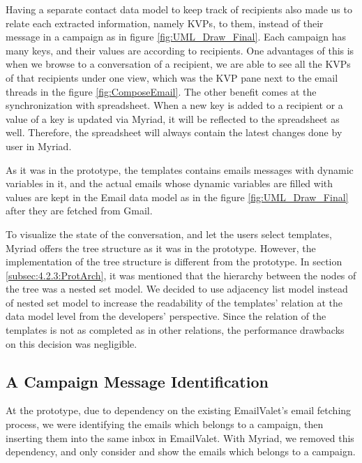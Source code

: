 Having a separate contact data model to keep track of recipients also made us to relate each extracted information, namely \ac{KVP}s, to them, instead of their message in a campaign as in figure \ref{fig:UML_Draw_Final}. Each campaign has many keys, and their values are according to recipients. One advantages of this is when we browse to a conversation of a recipient, we are able to see all the \ac{KVP}s of that recipients under one view, which was the \ac{KVP} pane next to the email threads in the figure \ref{fig:ComposeEmail}. The other benefit comes at the synchronization with spreadsheet. When a new key is added to a recipient or a value of a key is updated via Myriad, it will be reflected to the spreadsheet as well. Therefore, the spreadsheet will always contain the latest changes done by user in Myriad. 
\vspace{1cm}

As it was in the prototype, the templates contains emails messages with dynamic variables in it, and the actual emails whose dynamic variables are filled with values are kept in the Email data model as in the figure \ref{fig:UML_Draw_Final} after they are fetched from Gmail.
\vspace{1cm}

To visualize the state of the conversation, and let the users select templates, Myriad offers the tree structure as it was in the prototype. However, the implementation of the tree structure is different from the prototype. In section \ref{subsec:4.2.3:ProtArch}, it was mentioned that the hierarchy between the nodes of the tree was a nested set model. We decided to use adjacency list model instead of nested set model to increase the readability of the templates' relation at the data model level from the developers' perspective. Since the relation of the templates is not as completed as in other relations, the performance drawbacks on this decision was negligible. 

\subsection{A Campaign Message Identification}
\label{subsec:5.3.3:MessIden}

At the prototype, due to dependency on the existing EmailValet's email fetching process, we were identifying the emails which belongs to a campaign, then inserting them into the same inbox in EmailValet. With Myriad, we removed this dependency, and only consider and show the emails which belongs to a campaign.
\vspace{1cm}

